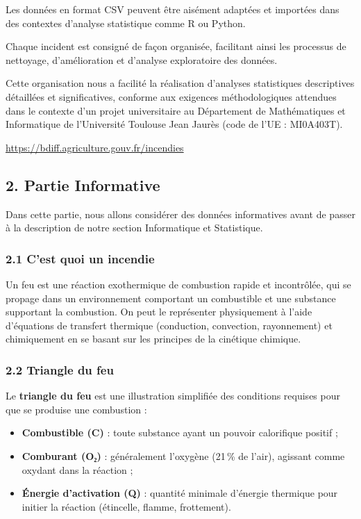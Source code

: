 \documentclass[
]{article}
\providecommand{\tightlist}{%
  \setlength{\itemsep}{0pt}\setlength{\parskip}{0pt}}
\begin{document}
Les données en format CSV peuvent être aisément adaptées et importées
dans des contextes d'analyse statistique comme R ou Python.

Chaque incident est consigné de façon organisée, facilitant ainsi les
processus de nettoyage, d'amélioration et d'analyse exploratoire des
données.

Cette organisation nous a facilité la réalisation d'analyses
statistiques descriptives détaillées et significatives, conforme aux
exigences méthodologiques attendues dans le contexte d'un projet
universitaire au Département de Mathématiques et Informatique de
l'Université Toulouse Jean Jaurès (code de l'UE : MI0A403T).

\url{https://bdiff.agriculture.gouv.fr/incendies}

\subsection{2. Partie Informative}\label{partie-informative}

Dans cette partie, nous allons considérer des données informatives avant
de passer à la description de notre section Informatique et Statistique.

\subsubsection{2.1 C'est quoi un incendie}\label{cest-quoi-un-incendie}

Un feu est une réaction exothermique de combustion rapide et
incontrôlée, qui se propage dans un environnement comportant un
combustible et une substance supportant la combustion. On peut le
représenter physiquement à l'aide d'équations de transfert thermique
(conduction, convection, rayonnement) et chimiquement en se basant sur
les principes de la cinétique chimique.

\subsubsection{2.2 Triangle du feu}\label{triangle-du-feu}

Le \textbf{triangle du feu} est une illustration simplifiée des
conditions requises pour que se produise une combustion :

\begin{itemize}
\tightlist
\item
  \textbf{Combustible (C)} : toute substance ayant un pouvoir
  calorifique positif ;
\item
  \textbf{Comburant (O₂)} : généralement l'oxygène (21\,\% de l'air),
  agissant comme oxydant dans la réaction ;
\item
  \textbf{Énergie d'activation (Q)} : quantité minimale d'énergie
  thermique pour initier la réaction (étincelle, flamme, frottement).
\end{itemize}
\end{document}

